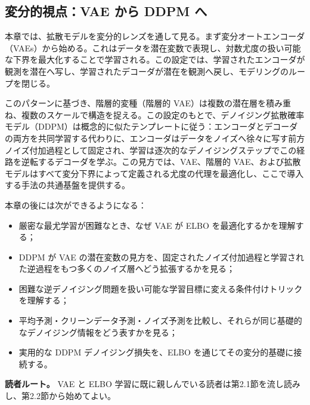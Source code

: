 \subsection*{変分的視点：VAE から DDPM へ}


本章では、拡散モデルを変分的レンズを通して見る。まず変分オートエンコーダ（VAEs）から始める。これはデータを潜在変数で表現し、対数尤度の扱い可能な下界を最大化することで学習される。この設定では、学習されたエンコーダが観測を潜在へ写し、学習されたデコーダが潜在を観測へ戻し、モデリングのループを閉じる。

このパターンに基づき、階層的変種（階層的 VAE）は複数の潜在層を積み重ね、複数のスケールで構造を捉える。この設定のもとで、デノイジング拡散確率モデル（DDPM）は概念的に似たテンプレートに従う：エンコーダとデコーダの両方を共同学習する代わりに、エンコーダはデータをノイズへ徐々に写す前方ノイズ付加過程として固定され、学習は逐次的なデノイジングステップでこの経路を逆転するデコーダを学ぶ。この見方では、VAE、階層的 VAE、および拡散モデルはすべて変分下界によって定義される尤度の代理を最適化し、ここで導入する手法の共通基盤を提供する。

本章の後には次ができるようになる：

\begin{itemize}
\item 厳密な最尤学習が困難なとき、なぜ VAE が ELBO を最適化するかを理解する；
\item DDPM が VAE の潜在変数の見方を、固定されたノイズ付加過程と学習された逆過程をもつ多くのノイズ層へどう拡張するかを見る；
\item 困難な逆デノイジング問題を扱い可能な学習目標に変える条件付けトリックを理解する；
\item 平均予測・クリーンデータ予測・ノイズ予測を比較し、それらが同じ基礎的なデノイジング情報をどう表すかを見る；
\item 実用的な DDPM デノイジング損失を、ELBO を通じてその変分的基礎に接続する。
\end{itemize}


\textbf{読者ルート。} VAE と ELBO 学習に既に親しんでいる読者は第2.1節を流し読みし、第2.2節から始めてよい。

